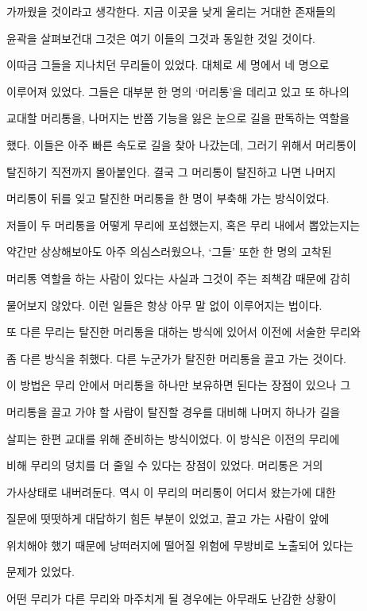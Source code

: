 가까웠을 것이라고 생각한다. 지금 이곳을 낮게 울리는 거대한 존재들의

윤곽을 살펴보건대 그것은 여기 이들의 그것과 동일한 것일 것이다.



이따금 그들을 지나치던 무리들이 있었다. 대체로 세 명에서 네 명으로

이루어져 있었다. 그들은 대부분 한 명의 `머리통'을 데리고 있고 또 하나의

교대할 머리통을, 나머지는 반쯤 기능을 잃은 눈으로 길을 판독하는 역할을

했다. 이들은 아주 빠른 속도로 길을 찾아 나갔는데, 그러기 위해서 머리통이

탈진하기 직전까지 몰아붙인다. 결국 그 머리통이 탈진하고 나면 나머지

머리통이 뒤를 잊고 탈진한 머리통을 한 명이 부축해 가는 방식이었다.

저들이 두 머리통을 어떻게 무리에 포섭했는지, 혹은 무리 내에서 뽑았는지는

약간만 상상해보아도 아주 의심스러웠으나, `그들' 또한 한 명의 고착된

머리통 역할을 하는 사람이 있다는 사실과 그것이 주는 죄책감 때문에 감히

물어보지 않았다. 이런 일들은 항상 아무 말 없이 이루어지는 법이다.



또 다른 무리는 탈진한 머리통을 대하는 방식에 있어서 이전에 서술한 무리와

좀 다른 방식을 취했다. 다른 누군가가 탈진한 머리통을 끌고 가는 것이다.

이 방법은 무리 안에서 머리통을 하나만 보유하면 된다는 장점이 있으나 그

머리통을 끌고 가야 할 사람이 탈진할 경우를 대비해 나머지 하나가 길을

살피는 한편 교대를 위해 준비하는 방식이었다. 이 방식은 이전의 무리에

비해 무리의 덩치를 더 줄일 수 있다는 장점이 있었다. 머리통은 거의

가사상태로 내버려둔다. 역시 이 무리의 머리통이 어디서 왔는가에 대한

질문에 떳떳하게 대답하기 힘든 부분이 있었고, 끌고 가는 사람이 앞에

위치해야 했기 때문에 낭떠러지에 떨어질 위험에 무방비로 노출되어 있다는

문제가 있었다.



어떤 무리가 다른 무리와 마주치게 될 경우에는 아무래도 난감한 상황이

